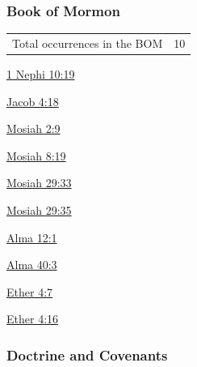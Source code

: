 				
				
		
	\subsubsection{Book of Mormon} %
		\label{UNFOLD-BOM}
	
		\begin{tabular}{ll}
			Total occurrences in the BOM & 10
		\end{tabular}
		
		\begin{compactdesc}
			\item[{\hyperref[1NEPHI-10-19]{1 Nephi 10:19}}]
			\item[{\hyperref[JACOB-4-18]{Jacob 4:18}}]
			\item[{\hyperref[MOSIAH-2-9]{Mosiah 2:9}}]
			\item[{\hyperref[MOSIAH-8-19]{Mosiah 8:19}}]
			\item[{\hyperref[MOSIAH-29-33]{Mosiah 29:33}}]
			\item[{\hyperref[MOSIAH-29-35]{Mosiah 29:35}}]
			\item[{\hyperref[ALMA-12-1]{Alma 12:1}}]
			\item[{\hyperref[ALMA-40-3]{Alma 40:3}}]
			\item[{\hyperref[ETHER-4-7]{Ether 4:7}}]
			\item[{\hyperref[ETHER-4-16]{Ether 4:16}}]
		\end{compactdesc}
		
	\subsubsection{Doctrine and Covenants} %
		\label{UNFOLD-DC}
	

